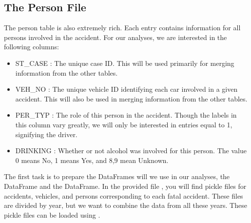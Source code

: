 \subsection*{The Person File}
The person table is also extremely rich. Each entry contains information for all
persons involved in the accident. For our analyses, we are interested in the
following columns:
\begin{itemize}
    \item ST\_CASE : The unique case ID. This will be used primarily for merging
        information from the other tables.
    \item VEH\_NO : The unique vehicle ID identifying each car involved in a given
        accident. This will also be used in merging information from the other
        tables.
    \item PER\_TYP : The role of this person in the accident. Though the labels in
        this column vary greatly, we will only be interested in entries equal to
        1, signifying the driver.
    \item DRINKING : Whether or not alcohol was involved for this person. The value
        0 means No, 1 means Yes, and 8,9 mean Unknown.
\end{itemize}

The first task is to prepare the DataFrames will we use in our analyses,
the  DataFrame and the  DataFrame.
In the provided file , you will find pickle files for accidents,
vehicles, and persons corresponding to each fatal accident. These files are
divided by year, but we want to combine the data from all these years. These
pickle files can be loaded using .

